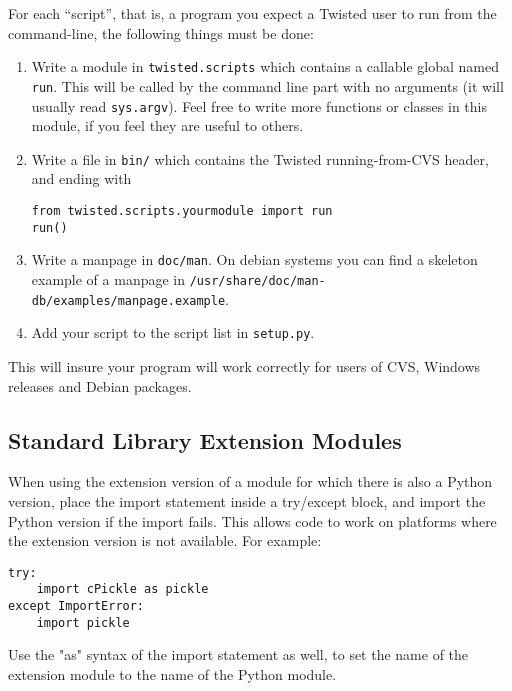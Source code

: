 For each ``script'', that is, a program you expect a Twisted user     to run from the command-line, the following things must be done:\begin{enumerate}
\item Write a module in \texttt{twisted.\linebreak[1]scripts}        which contains a callable global named \texttt{run}. This        will be called by the command line part with no arguments (it        will usually read \texttt{sys.\linebreak[1]argv}). Feel free to write more        functions or classes in this module, if you feel they are useful        to others.
\item Write a file in \texttt{bin/} which contains the           Twisted running-from-CVS header, and ending with   \begin{verbatim}
from twisted.scripts.yourmodule import run
run()
\end{verbatim}

\item Write a manpage in \texttt{doc/man}.       On debian systems you can find a skeleton example of a manpage in       \texttt{/usr/share/doc/man-db/examples/manpage.\linebreak[1]example}.
\item Add your script to the script list in       \texttt{setup.\linebreak[1]py}.
\end{enumerate}


This will insure your program will work correctly for users of CVS,     Windows releases and Debian packages.

\subsection{Standard Library Extension Modules}


When using the extension version of a module for which there is also     a Python version, place the import statement inside a try/except block,     and import the Python version if the import fails.  This allows code to     work on platforms where the extension version is not available.  For     example:  \begin{verbatim}
try:
    import cPickle as pickle
except ImportError:
    import pickle
\end{verbatim}
      Use the "as" syntax of the import statement as well, to set     the name of the extension module to the name of the Python module.

